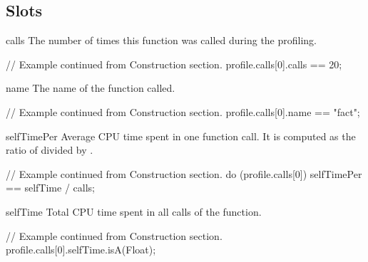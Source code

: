\subsection{Slots}

\begin{urbiscriptapi}
\item[calls]%
  The number of times this function was called during the profiling.
\begin{urbiassert}
// Example continued from Construction section.
profile.calls[0].calls == 20;
\end{urbiassert}

\item[name]%
  The name of the function called.
\begin{urbiassert}
// Example continued from Construction section.
profile.calls[0].name == "fact";
\end{urbiassert}

\item[selfTimePer]%
  Average CPU time spent in one function call. It is computed as the ratio
  of  divided by .
\begin{urbiassert}
// Example continued from Construction section.
do (profile.calls[0])
{
  selfTimePer == selfTime / calls;
}
\end{urbiassert}

\item[selfTime]%
  Total CPU time spent in all calls of the function.
\begin{urbiassert}
// Example continued from Construction section.
profile.calls[0].selfTime.isA(Float);
\end{urbiassert}

\end{urbiscriptapi}


